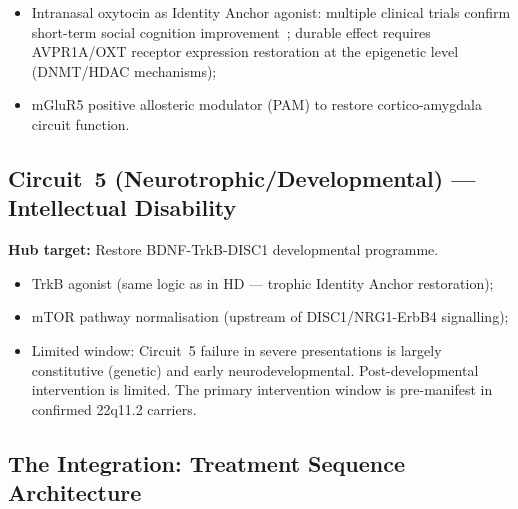 \documentclass[12pt,a4paper]{article}
\begin{document}
\begin{itemize}
  \item Intranasal oxytocin as Identity Anchor agonist:
    multiple clinical trials confirm short-term social
    cognition improvement~\cite{Feifel2012}; durable
    effect requires AVPR1A/OXT receptor expression
    restoration at the epigenetic level (DNMT/HDAC
    mechanisms);
  \item mGluR5 positive allosteric modulator (PAM) to
    restore cortico-amygdala circuit function.
\end{itemize}

\subsection{Circuit~5 (Neurotrophic/Developmental) ---
Intellectual Disability}

\textbf{Hub target:} Restore BDNF-TrkB-DISC1 developmental
programme.

\begin{itemize}
  \item TrkB agonist (same logic as in HD --- trophic
    Identity Anchor restoration);
  \item mTOR pathway normalisation (upstream of
    DISC1/NRG1-ErbB4 signalling);
  \item Limited window: Circuit~5 failure in severe
    presentations is largely constitutive (genetic) and
    early neurodevelopmental. Post-developmental
    intervention is limited. The primary intervention
    window is pre-manifest in confirmed 22q11.2 carriers.
\end{itemize}

\subsection{The Integration: Treatment Sequence Architecture}
\end{document}
